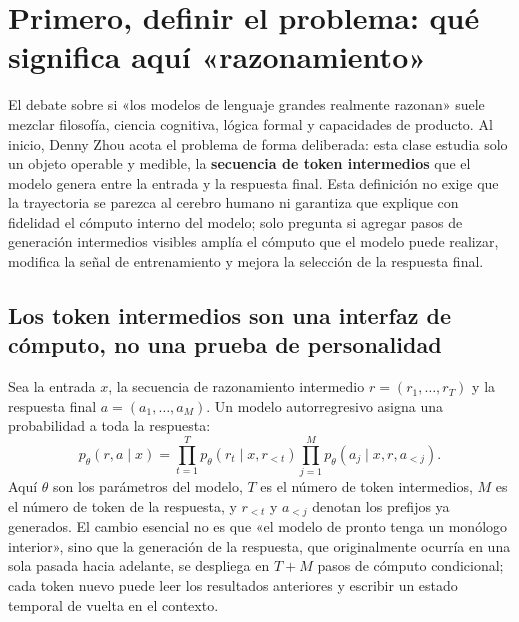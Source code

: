 \section{Primero, definir el problema: qué significa aquí «razonamiento»}

El debate sobre si «los modelos de lenguaje grandes realmente razonan» suele mezclar filosofía, ciencia cognitiva, lógica formal y capacidades de producto. Al inicio, Denny Zhou acota el problema de forma deliberada: esta clase estudia solo un objeto operable y medible, la \textbf{secuencia de token intermedios} que el modelo genera entre la entrada y la respuesta final. Esta definición no exige que la trayectoria se parezca al cerebro humano ni garantiza que explique con fidelidad el cómputo interno del modelo; solo pregunta si agregar pasos de generación intermedios visibles amplía el cómputo que el modelo puede realizar, modifica la señal de entrenamiento y mejora la selección de la respuesta final.



\subsection{Los token intermedios son una interfaz de cómputo, no una prueba de personalidad}

Sea la entrada $x$, la secuencia de razonamiento intermedio $r=(r_1,\ldots,r_T)$ y la respuesta final $a=(a_1,\ldots,a_M)$. Un modelo autorregresivo asigna una probabilidad a toda la respuesta:
\[
p_\theta(r,a\mid x)
=\prod_{t=1}^{T}p_\theta(r_t\mid x,r_{<t})
 \prod_{j=1}^{M}p_\theta(a_j\mid x,r,a_{<j}).
\]
Aquí $\theta$ son los parámetros del modelo, $T$ es el número de token intermedios, $M$ es el número de token de la respuesta, y $r_{<t}$ y $a_{<j}$ denotan los prefijos ya generados. El cambio esencial no es que «el modelo de pronto tenga un monólogo interior», sino que la generación de la respuesta, que originalmente ocurría en una sola pasada hacia adelante, se despliega en $T+M$ pasos de cómputo condicional; cada token nuevo puede leer los resultados anteriores y escribir un estado temporal de vuelta en el contexto.

